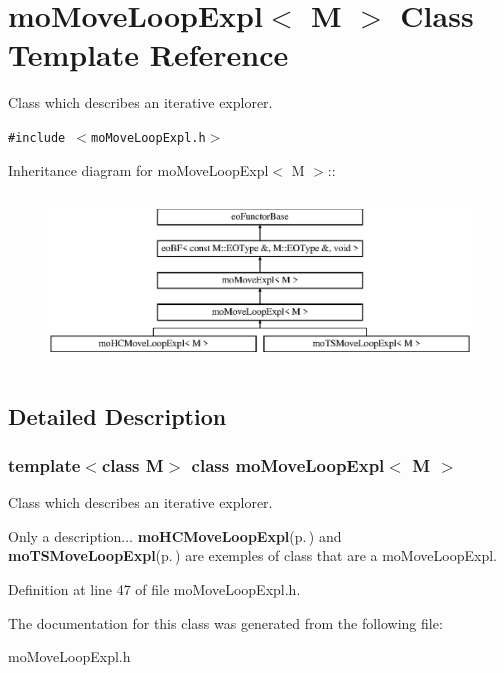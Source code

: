 \section{mo\-Move\-Loop\-Expl$<$ M $>$ Class Template Reference}
\label{classmo_move_loop_expl}
Class which describes an iterative explorer.  


{\tt \#include $<$mo\-Move\-Loop\-Expl.h$>$}

Inheritance diagram for mo\-Move\-Loop\-Expl$<$ M $>$::\begin{figure}[H]
\begin{center}
\leavevmode
\includegraphics[height=4.59016cm]{classmo_move_loop_expl}
\end{center}
\end{figure}


\subsection{Detailed Description}
\subsubsection*{template$<$class M$>$ class mo\-Move\-Loop\-Expl$<$ M $>$}

Class which describes an iterative explorer. 

Only a description... {\bf mo\-HCMove\-Loop\-Expl}{\rm (p.\,\pageref{classmo_h_c_move_loop_expl})} and {\bf mo\-TSMove\-Loop\-Expl}{\rm (p.\,\pageref{classmo_t_s_move_loop_expl})} are exemples of class that are a mo\-Move\-Loop\-Expl. 



Definition at line 47 of file mo\-Move\-Loop\-Expl.h.

The documentation for this class was generated from the following file:\begin{CompactItemize}
\item 
mo\-Move\-Loop\-Expl.h\end{CompactItemize}
